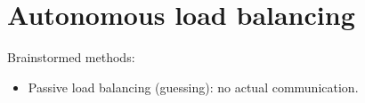 


\section{Autonomous load balancing}



Brainstormed methods:
\begin{itemize}
	\item Passive load balancing (guessing):  no actual communication.
\end{itemize}

